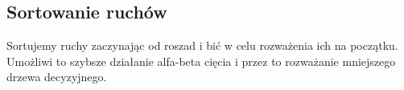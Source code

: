 \subsection{Sortowanie ruchów}
\label{subsec:sortowanie-ruchow}

{
    \color{red}
    \large Sortujemy ruchy zaczynając od roszad i bić w celu rozważenia ich na początku.
    Umożliwi to szybsze działanie alfa-beta cięcia i przez to rozważanie mniejszego drzewa decyzyjnego.
}